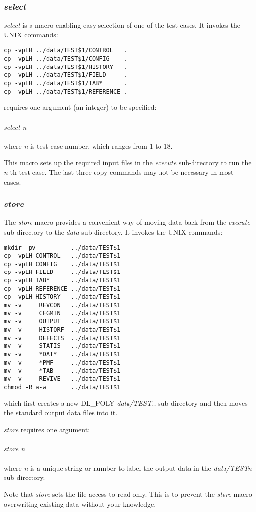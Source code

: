 \subsubsection*{{\sl select}}

{\sl select} is a macro enabling easy selection of one of the test
cases.  It invokes the UNIX commands:

\begin{verbatim}
cp -vpLH ../data/TEST$1/CONTROL   .
cp -vpLH ../data/TEST$1/CONFIG    .
cp -vpLH ../data/TEST$1/HISTORY   .
cp -vpLH ../data/TEST$1/FIELD     .
cp -vpLH ../data/TEST$1/TAB*      .
cp -vpLH ../data/TEST$1/REFERENCE .
\end{verbatim}

 requires one argument (an integer) to be specified: \\
\\
{\sl select n} \\
\\
\noindent where {\sl n} is test case number, which ranges from 1 to
18.

This macro sets up the required input files in the {\em execute}
sub-directory to run the {\sl n}-th test
case.  The last three copy commands may not be necessary in
most cases.

\subsubsection*{{\sl store}}

The {\sl store} macro provides a convenient way of moving data
back from the {\em execute} sub-directory to
the {\em data} sub-directory.  It invokes the
UNIX commands:

\begin{verbatim}
mkdir -pv          ../data/TEST$1
cp -vpLH CONTROL   ../data/TEST$1
cp -vpLH CONFIG    ../data/TEST$1
cp -vpLH FIELD     ../data/TEST$1
cp -vpLH TAB*      ../data/TEST$1
cp -vpLH REFERENCE ../data/TEST$1
cp -vpLH HISTORY   ../data/TEST$1
mv -v     REVCON   ../data/TEST$1
mv -v     CFGMIN   ../data/TEST$1
mv -v     OUTPUT   ../data/TEST$1
mv -v     HISTORF  ../data/TEST$1
mv -v     DEFECTS  ../data/TEST$1
mv -v     STATIS   ../data/TEST$1
mv -v     *DAT*    ../data/TEST$1
mv -v     *PMF     ../data/TEST$1
mv -v     *TAB     ../data/TEST$1
mv -v     REVIVE   ../data/TEST$1
chmod -R a-w       ../data/TEST$1
\end{verbatim}

\noindent which first creates a new DL\_POLY {\em data/TEST..}
sub-directory and then moves the standard \D
output data files into it.

{\sl store} requires one argument:\\
\\
{\sl store n}\\
\\
\noindent where {\sl n} is a unique string or number to label the
output data in the {\em data/TESTn} sub-directory.

Note that {\sl store} sets the file access to read-only.  This is
to prevent the {\sl store} macro overwriting existing data without
your knowledge.
